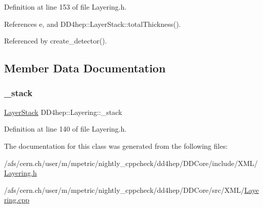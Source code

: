 Definition at line 153 of file Layering.\+h.



References e, and D\+D4hep\+::\+Layer\+Stack\+::total\+Thickness().



Referenced by create\+\_\+detector().



\subsection{Member Data Documentation}
\hypertarget{class_d_d4hep_1_1_layering_a3abc06c9a003b7e5cb163660652a6318}{}\label{class_d_d4hep_1_1_layering_a3abc06c9a003b7e5cb163660652a6318} 
\subsubsection{\texorpdfstring{\+\_\+stack}{\_stack}}
{\footnotesize\ttfamily \hyperlink{class_d_d4hep_1_1_layer_stack}{Layer\+Stack} D\+D4hep\+::\+Layering\+::\+\_\+stack}



Definition at line 140 of file Layering.\+h.



The documentation for this class was generated from the following files\+:\begin{DoxyCompactItemize}
\item 
/afs/cern.\+ch/user/m/mpetric/nightly\+\_\+cppcheck/dd4hep/\+D\+D\+Core/include/\+X\+M\+L/\hyperlink{_layering_8h}{Layering.\+h}\item 
/afs/cern.\+ch/user/m/mpetric/nightly\+\_\+cppcheck/dd4hep/\+D\+D\+Core/src/\+X\+M\+L/\hyperlink{_layering_8cpp}{Layering.\+cpp}\end{DoxyCompactItemize}
